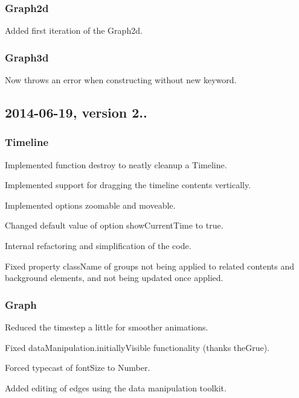 \subsubsection*{Graph2d}


\begin{DoxyItemize}
\item Added first iteration of the Graph2d.
\end{DoxyItemize}

\subsubsection*{Graph3d}


\begin{DoxyItemize}
\item Now throws an error when constructing without new keyword.
\end{DoxyItemize}

\subsection*{2014-\/06-\/19, version 2..}

\subsubsection*{Timeline}


\begin{DoxyItemize}
\item Implemented function {\ttfamily destroy} to neatly cleanup a Timeline.
\item Implemented support for dragging the timeline contents vertically.
\item Implemented options {\ttfamily zoomable} and {\ttfamily moveable}.
\item Changed default value of option {\ttfamily show\+Current\+Time} to true.
\item Internal refactoring and simplification of the code.
\item Fixed property {\ttfamily class\+Name} of groups not being applied to related contents and background elements, and not being updated once applied.
\end{DoxyItemize}

\subsubsection*{Graph}


\begin{DoxyItemize}
\item Reduced the timestep a little for smoother animations.
\item Fixed data\+Manipulation.\+initially\+Visible functionality (thanks the\+Grue).
\item Forced typecast of font\+Size to Number.
\item Added editing of edges using the data manipulation toolkit.
\end{DoxyItemize}

